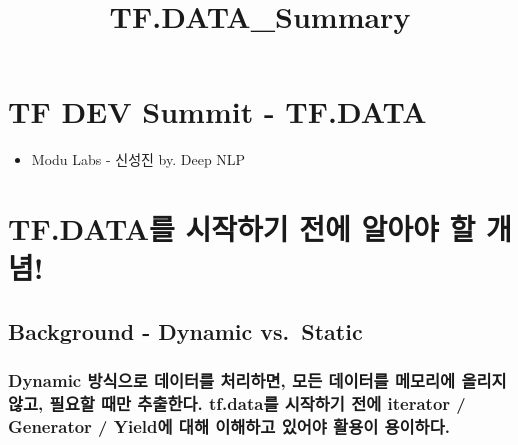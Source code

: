 \documentclass[11pt]{article}
\title{TF.DATA\_Summary}
\providecommand{\tightlist}{%
      \setlength{\itemsep}{0pt}\setlength{\parskip}{0pt}}
\begin{document}
    
    
    \maketitle
    
    

    
    \usepackage{kotex}

    \hypertarget{tf-dev-summit---tf.data}{%
\section{TF DEV Summit - TF.DATA}\label{tf-dev-summit---tf.data}}

\begin{itemize}
\tightlist
\item
  Modu Labs - 신성진 by. Deep NLP
\end{itemize}

    \hypertarget{tf.datauxb97c-uxc2dcuxc791uxd558uxae30-uxc804uxc5d0-uxc54cuxc544uxc57c-uxd560-uxac1cuxb150}{%
\section{TF.DATA를 시작하기 전에 알아야 할
개념!}\label{tf.datauxb97c-uxc2dcuxc791uxd558uxae30-uxc804uxc5d0-uxc54cuxc544uxc57c-uxd560-uxac1cuxb150}}

\hypertarget{background---dynamic-vs.static}{%
\subsection{Background - Dynamic
vs.~Static}\label{background---dynamic-vs.static}}

\hypertarget{dynamic-uxbc29uxc2dduxc73cuxb85c-uxb370uxc774uxd130uxb97c-uxcc98uxb9acuxd558uxba74-uxbaa8uxb4e0-uxb370uxc774uxd130uxb97c-uxba54uxbaa8uxb9acuxc5d0-uxc62cuxb9acuxc9c0-uxc54auxace0-uxd544uxc694uxd560-uxb54cuxb9cc-uxcd94uxcd9cuxd55cuxb2e4.-tf.datauxb97c-uxc2dcuxc791uxd558uxae30-uxc804uxc5d0-iterator-generator-yielduxc5d0-uxb300uxd574-uxc774uxd574uxd558uxace0-uxc788uxc5b4uxc57c-uxd65cuxc6a9uxc774-uxc6a9uxc774uxd558uxb2e4.}{%
\subsubsection{Dynamic 방식으로 데이터를 처리하면, 모든 데이터를
메모리에 올리지 않고, 필요할 때만 추출한다. tf.data를 시작하기 전에
iterator / Generator / Yield에 대해 이해하고 있어야 활용이
용이하다.}\label{dynamic-uxbc29uxc2dduxc73cuxb85c-uxb370uxc774uxd130uxb97c-uxcc98uxb9acuxd558uxba74-uxbaa8uxb4e0-uxb370uxc774uxd130uxb97c-uxba54uxbaa8uxb9acuxc5d0-uxc62cuxb9acuxc9c0-uxc54auxace0-uxd544uxc694uxd560-uxb54cuxb9cc-uxcd94uxcd9cuxd55cuxb2e4.-tf.datauxb97c-uxc2dcuxc791uxd558uxae30-uxc804uxc5d0-iterator-generator-yielduxc5d0-uxb300uxd574-uxc774uxd574uxd558uxace0-uxc788uxc5b4uxc57c-uxd65cuxc6a9uxc774-uxc6a9uxc774uxd558uxb2e4.}}
\end{document}
